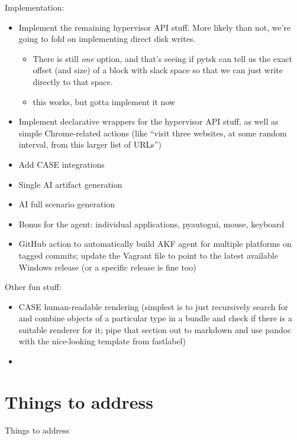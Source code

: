 Implementation:

\begin{itemize}
\tightlist
\item
  Implement the remaining hypervisor API stuff. More likely than not,
  we're going to fold on implementing direct disk writes.

  \begin{itemize}
  \tightlist
  \item
    There is still \emph{one} option, and that's seeing if pytsk can
    tell us the exact offset (and size) of a block with slack space so
    that we can just write directly to that space.
  \item
    this works, but gotta implement it now
  \end{itemize}
\item
  Implement declarative wrappers for the hypervisor API stuff, as well
  as simple Chrome-related actions (like ``visit three websites, at some
  random interval, from this larger list of URLs'')
\item
  Add CASE integrations
\item
  Single AI artifact generation
\item
  AI full scenario generation
\item
  Bonus for the agent: individual applications, pyautogui, mouse,
  keyboard
\item
  GitHub action to automatically build AKF agent for multiple platforms
  on tagged commits; update the Vagrant file to point to the latest
  available Windows release (or a specific release is fine too)
\end{itemize}

Other fun stuff:

\begin{itemize}
\tightlist
\item
  CASE human-readable rendering (simplest is to just recursively search
  for and combine objects of a particular type in a bundle and check if
  there is a suitable renderer for it; pipe that section out to markdown
  and use pandoc with the nice-looking template from fastlabel)
\item
\end{itemize}

\section{Things to address}\label{things-to-address}

Things to address

